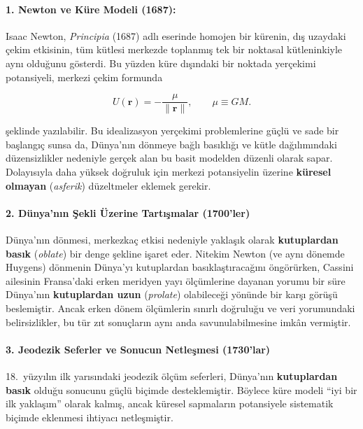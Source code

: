 \paragraph{1. Newton ve Küre Modeli (1687):}
Isaac Newton, \emph{Principia} (1687) adlı eserinde homojen bir kürenin, dış uzaydaki çekim etkisinin, tüm kütlesi merkezde toplanmış tek bir noktasal kütleninkiyle aynı olduğunu gösterdi. Bu yüzden küre dışındaki bir noktada yerçekimi potansiyeli,
merkezi çekim formunda

\begin{equation}
U(\mathbf{r})=-\frac{\mu}{\lVert \mathbf{r}\rVert},
\qquad \mu \equiv GM.
\label{eq:pointmass_potential}
\end{equation}

şeklinde yazılabilir. Bu idealizasyon yerçekimi problemlerine güçlü ve sade bir başlangıç sunsa da, Dünya’nın dönmeye bağlı basıklığı ve kütle dağılımındaki düzensizlikler nedeniyle
gerçek alan bu basit modelden düzenli olarak sapar. Dolayısıyla daha yüksek doğruluk için merkezi potansiyelin üzerine  \textbf{küresel olmayan} (\emph{asferik}) düzeltmeler eklemek gerekir.

\paragraph{2. Dünya’nın Şekli Üzerine Tartışmalar (1700'ler)}
Dünya’nın dönmesi, merkezkaç etkisi nedeniyle yaklaşık olarak \textbf{kutuplardan basık} (\emph{oblate}) bir denge şekline işaret eder. Nitekim Newton (ve aynı dönemde Huygens) dönmenin Dünya’yı kutuplardan basıklaştıracağını öngörürken,
Cassini ailesinin Fransa’daki erken meridyen yayı ölçümlerine dayanan yorumu bir süre Dünya’nın \textbf{kutuplardan uzun} (\emph{prolate}) olabileceği yönünde bir karşı görüşü beslemiştir.
Ancak erken dönem ölçümlerin sınırlı doğruluğu ve veri yorumundaki belirsizlikler, bu tür zıt sonuçların aynı anda savunulabilmesine imkân vermiştir. 

\paragraph{3. Jeodezik Seferler ve Sonucun Netleşmesi (1730'lar)}
18.\ yüzyılın ilk yarısındaki jeodezik ölçüm seferleri,
Dünya’nın \textbf{kutuplardan basık} olduğu sonucunu güçlü biçimde desteklemiştir. Böylece küre modeli “iyi bir ilk yaklaşım” olarak kalmış, ancak küresel sapmaların potansiyele sistematik biçimde eklenmesi ihtiyacı netleşmiştir.

